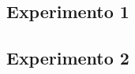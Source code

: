 \documentclass[../main.tex]{subfiles}
\begin{document}
    \subsection{Experimento 1}
    \item 
    \subsection{Experimento 2}
    \item 
\end{document}
